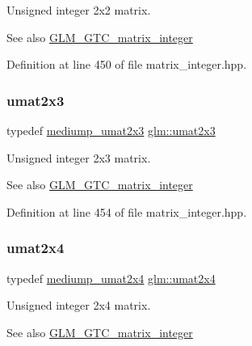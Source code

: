 Unsigned integer 2x2 matrix. \begin{DoxySeeAlso}{See also}
\mbox{\hyperlink{group__gtc__matrix__integer}{G\+L\+M\+\_\+\+G\+T\+C\+\_\+matrix\+\_\+integer}} 
\end{DoxySeeAlso}


Definition at line 450 of file matrix\+\_\+integer.\+hpp.

\mbox{\label{group__gtc__matrix__integer_ga890ae28f9230794138b2c89f44ce3376}} 
\subsubsection{\texorpdfstring{umat2x3}{umat2x3}}
{\footnotesize\ttfamily typedef \mbox{\hyperlink{group__gtc__matrix__integer_ga23dfc19249ad27dc4b02615f1d045ba1}{mediump\+\_\+umat2x3}} \mbox{\hyperlink{group__gtc__matrix__integer_ga890ae28f9230794138b2c89f44ce3376}{glm\+::umat2x3}}}

Unsigned integer 2x3 matrix. \begin{DoxySeeAlso}{See also}
\mbox{\hyperlink{group__gtc__matrix__integer}{G\+L\+M\+\_\+\+G\+T\+C\+\_\+matrix\+\_\+integer}} 
\end{DoxySeeAlso}


Definition at line 454 of file matrix\+\_\+integer.\+hpp.

\mbox{\label{group__gtc__matrix__integer_ga3b23b164240cf4dfb429776da7be9d88}} 
\subsubsection{\texorpdfstring{umat2x4}{umat2x4}}
{\footnotesize\ttfamily typedef \mbox{\hyperlink{group__gtc__matrix__integer_ga972445669c6e6652716f3f0b664b94cd}{mediump\+\_\+umat2x4}} \mbox{\hyperlink{group__gtc__matrix__integer_ga3b23b164240cf4dfb429776da7be9d88}{glm\+::umat2x4}}}

Unsigned integer 2x4 matrix. \begin{DoxySeeAlso}{See also}
\mbox{\hyperlink{group__gtc__matrix__integer}{G\+L\+M\+\_\+\+G\+T\+C\+\_\+matrix\+\_\+integer}} 
\end{DoxySeeAlso}


